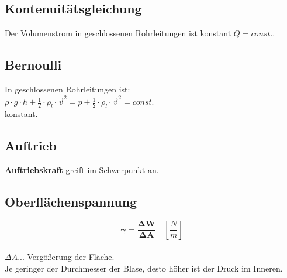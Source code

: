 


\subsection{Kontenuitätsgleichung}
Der Volumenstrom in geschlossenen Rohrleitungen ist konstant $Q=const.$.

\subsection{Bernoulli}
In geschlossenen Rohrleitungen ist:\\
$\rho \cdot g\cdot h + \frac{1}{2} \cdot \rho_l \cdot \vec{v}^2 = p + \frac{1}{2} \cdot \rho_l \cdot \vec{v}^2 = const.$\\
konstant.


\subsection{Auftrieb}  
\textbf{Auftriebskraft} greift im Schwerpunkt an.

\subsection{Oberflächenspannung}
\[\bm{\gamma = \frac{\Delta W }{\Delta A}} \quad [\frac{N}{m}]\]\\
$\Delta A$... Vergößerung der Fläche.\\
Je geringer der Durchmesser der Blase, desto höher ist der Druck im Inneren.\\
